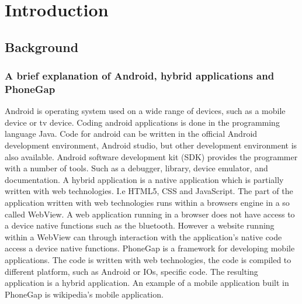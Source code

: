 \chapter{Introduction}
\section{Background}
\subsection{A brief explanation of Android, hybrid applications and PhoneGap}
Android is operating system used on a wide range of devices, such as a mobile device or tv device. Coding android applications is done in the programming language Java. Code for android can be written in the official Android development environment, Android studio, but other development environment is also available. 
\newline
\newline
Android software development kit (SDK) provides the programmer with a number of tools. Such as a debugger, library, device emulator, and documentation.  
\newline
\newline
A hybrid application is a native application which is partially written with web technologies. I.e HTML5, CSS and JavaScript. The part of the application written with web technologies runs within a browsers engine in a so called WebView. A web application running in a browser does not have access to a device native functions such as the bluetooth. However a website running within a WebView can through interaction with the application's native code access a device native functions.
\newline
\newline
PhoneGap is a framework for developing mobile applications. The code is written with web technologies, the code is compiled to different platform, such as Android or IOs, specific code. The resulting application is a hybrid application. An example of a mobile application built in PhoneGap is wikipedia's mobile application.  

